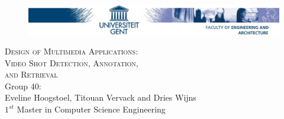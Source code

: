 

\begin{titlepage}
\clearpage
{}

\begin{figure}[!ht]
  \begin{adjustwidth}{-1.5cm}{}
    \centering
    \includegraphics[width=\paperwidth]{logo.jpg}
  \end{adjustwidth}
\end{figure}

\begin{center}

\fontsize{12pt}{14pt}
\selectfont
 
\vspace{6cm} 
\Huge \textsc{Design of Multimedia Applications:}\\ 
\vspace{1cm}
\huge
\textsc{Video Shot Detection, Annotation,\\ and Retrieval}\\
\vspace{10.5cm}
\Large
Group 40:\\
Eveline Hoogstoel, Titouan Vervack and Dries Wijns\\
$1^{st}$ Master in Computer Science Engineering


\end{center}
\end{titlepage}

\thispagestyle{empty}